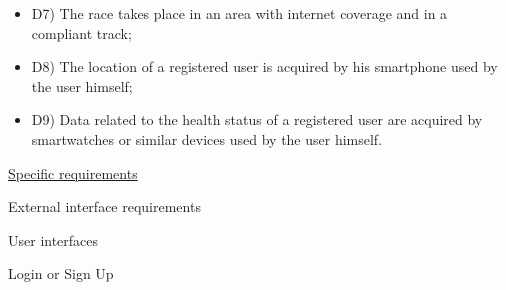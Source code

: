 \documentclass{article}
\begin{document}
\begin{legal}
\begin{legal}
\begin{legal}
{\begin{itemize}
				\item D7) The race takes place in an area with internet coverage and in a compliant track;\\
				\item D8) The location of a registered user is acquired by his smartphone used by the user himself;\\
				\item D9) Data related to the health status of a registered user are acquired by smartwatches or similar devices used by the user himself.\\
				\end{itemize}
			}
			\end{legal}
		\end{legal}
	
\newpage
	\item \underline{Specific requirements}\\
  		\begin{legal}
		\item External interface requirements\\
			\begin{legal}
    			\item User interfaces \\
					\begin{legal}
    				\item Login or Sign Up 
						\begin{figure}[H]
						\centering

\end{figure}
\end{legal}
\end{legal}
\end{legal}
\end{legal}
\end{document}
